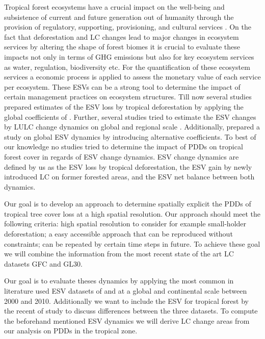 	Tropical forest ecosystems have a crucial impact on the well-being and subsistence of current and future generation out of humanity through the provision of regulatory, supporting, provisioning, and cultural services \citep{Costanza1997}. On the fact that deforestation and \ac{LC} changes lead to major changes in ecosystem services by altering the shape of forest biomes it is crucial to evaluate these impacts not only in terms of \ac{GHG} emissions but also for key ecosystem services as water, regulation, biodiversity etc. For the quantification of these ecosystem services a economic process is applied to assess the monetary value of each service per ecosystem. These \acp{ESV} can be a strong tool to determine the impact of certain management practices on ecosystem structures. Till now several studies prepared estimates of the \ac{ESV} loss by tropical deforestation by applying the global coefficients of \citeauthor{Costanza2014} \citep{Song2018,Costanza2014}. Further, several studies tried to estimate the \ac{ESV} changes by \ac{LULC} change dynamics on global and regional scale \citep{Costanza1997,Sannigrahi2018,Wang2006,Kreuter2001,Zhao2004}. Additionally, \citet{Groot2012} prepared a study on global \ac{ESV} dynamics by introducing alternative coefficients. To best of our knowledge no studies tried to determine the impact of \acp{PDD} on tropical forest cover in regards of \ac{ESV} change dynamics. \ac{ESV} change dynamics are defined by us as the \ac{ESV} loss by tropical deforestation, the \ac{ESV} gain by newly introduced \ac{LC} on former forested areas, and the \ac{ESV} net balance between both dynamics.

	 Our goal is to develop an approach to determine spatially explicit the \acp{PDD} of tropical tree cover loss at a high spatial resolution. Our approach should meet the following criteria: high spatial resolution to consider for example small-holder deforestation; a easy accessible approach that can be reproduced without constraints; can be repeated by certain time steps in future. To achieve these goal we will combine the information from the most recent state of the art \ac{LC} datasets \ac{GFC} and \ac{GL30}.

	 Our goal is to evaluate theses dynamics by applying the most common in literature used \ac{ESV} datasets of \citeauthor{Costanza2014} and \citeauthor{Groot2012} at a global and continental scale between 2000 and 2010. Additionally we want to include the \ac{ESV} for tropical forest by the recent of study \citet{Siikamaki2015} to discuss differences between the three datasets. To compute the beforehand mentioned \ac{ESV} dynamics we will derive \ac{LC} change areas from our analysis on \acp{PDD} in the tropical zone.